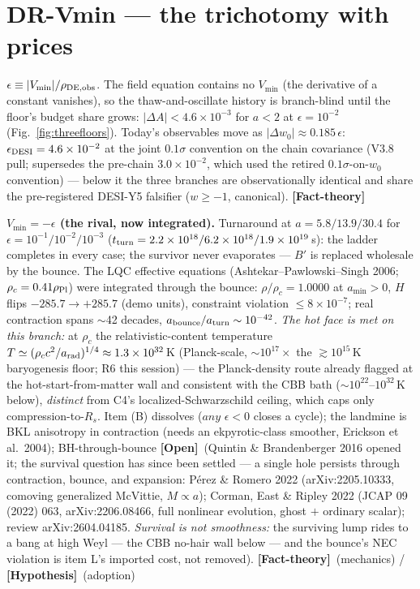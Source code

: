 \documentclass[11pt]{article}
\newcommand{\factth}{\textcolor{green!40!black}{\textbf{[Fact-theory]}}}
\newcommand{\hyp}{\textcolor{orange!80!black}{\textbf{[Hypothesis]}}}
\newcommand{\open}{\textcolor{red!70!black}{\textbf{[Open]}}}
\begin{document}
\section{DR-Vmin --- the trichotomy with prices}
$\epsilon\equiv|V_{\min}|/\rho_{\rm DE,obs}$. The field equation contains no $V_{\min}$ (the derivative of a constant vanishes), so the thaw-and-oscillate history is branch-blind until the floor's budget share grows: $|\Delta A|<4.6\times10^{-3}$ for $a<2$ at $\epsilon=10^{-2}$ (Fig.~\ref{fig:threefloors}). Today's observables move as $|\Delta w_0|\approx0.185\,\epsilon$: \textbf{$\epsilon_{\rm DESI}=4.6\times10^{-2}$} at the joint $0.1\sigma$ convention on the chain covariance (V3.8 pull; supersedes the pre-chain $3.0\times10^{-2}$, which used the retired $0.1\sigma$-on-$w_0$ convention) --- below it the three branches are observationally identical and share the pre-registered DESI-Y5 falsifier ($w\ge-1$, canonical). \factth

\textbf{$V_{\min}=-\epsilon$ (the rival, now integrated).} Turnaround at $a=5.8/13.9/30.4$ for $\epsilon=10^{-1}/10^{-2}/10^{-3}$ ($t_{\rm turn}=2.2\times10^{18}/6.2\times10^{18}/1.9\times10^{19}$\,s): the ladder completes in every case; the survivor never evaporates --- $B'$ is replaced wholesale by the bounce. The LQC effective equations (Ashtekar--Pawlowski--Singh 2006; $\rho_c=0.41\rho_{\rm Pl}$) were integrated through the bounce: $\rho/\rho_c=1.0000$ at $a_{\min}>0$, $H$ flips $-285.7\to+285.7$ (demo units), constraint violation $\le8\times10^{-7}$; real contraction spans $\sim$42 decades, $a_{\rm bounce}/a_{\rm turn}\sim10^{-42}$. \emph{The hot face is met on this branch:} at $\rho_c$ the relativistic-content temperature $T\simeq(\rho_c c^2/a_{\rm rad})^{1/4}\approx1.3\times10^{32}$\,K (Planck-scale, $\sim10^{17}\times$ the $\gtrsim10^{15}$\,K baryogenesis floor; R6 this session) --- the Planck-density route already flagged at the hot-start-from-matter wall and consistent with the CBB bath ($\sim10^{22}$--$10^{32}$\,K below), \emph{distinct} from C4's localized-Schwarzschild ceiling, which caps only compression-to-$R_s$. Item (B) dissolves ($any$ $\epsilon<0$ closes a cycle); the landmine is BKL anisotropy in contraction (needs an ekpyrotic-class smoother, Erickson et al.\ 2004); BH-through-bounce \open\ (Quintin \& Brandenberger 2016 opened it; the survival question has since been settled --- a single hole persists through contraction, bounce, and expansion: P\'erez \& Romero 2022 (arXiv:2205.10333, comoving generalized McVittie, $M\propto a$); Corman, East \& Ripley 2022 (JCAP 09 (2022) 063, arXiv:2206.08466, full nonlinear evolution, ghost $+$ ordinary scalar); review arXiv:2604.04185. \emph{Survival is not smoothness:} the surviving lump rides to a bang at high Weyl --- the CBB no-hair wall below --- and the bounce's NEC violation is item L's imported cost, not removed). \factth\ (mechanics) / \hyp\ (adoption)
\end{document}
